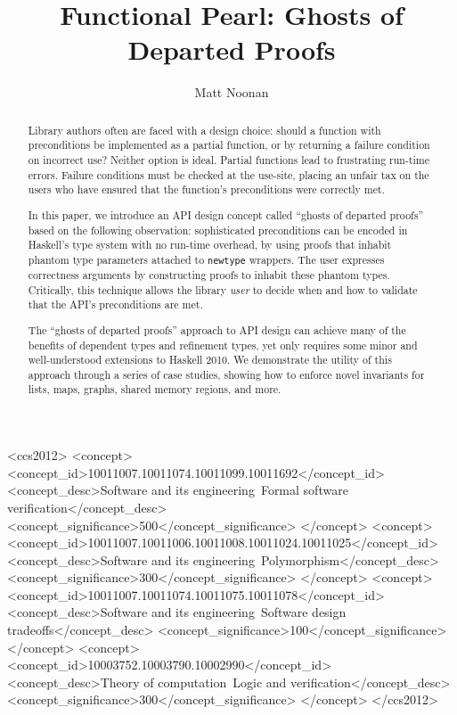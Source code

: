 \documentclass[format=sigplan, review=false, screen=true]{acmart}
\begin{document}
\title[Ghosts of Departed Proofs]{Functional Pearl: Ghosts of Departed Proofs}

\author{Matt Noonan}


\begin{abstract}

  Library authors often are faced with a design choice: should a function with
  preconditions be implemented as a partial function, or by returning a failure
  condition on incorrect use? Neither option is ideal. Partial functions lead
  to frustrating run-time errors. Failure conditions must be checked
  at the use-site,
  placing an unfair tax on the users who have ensured that the function's
  preconditions were correctly met.
  
  In this paper, we introduce an API design concept called ``ghosts of departed
  proofs'' based on the following observation: sophisticated preconditions can be
  encoded in Haskell's type system with no run-time overhead, by using proofs
  that inhabit phantom type parameters attached to \texttt{newtype} wrappers.
  The user expresses correctness arguments by constructing proofs to inhabit
  these phantom types.
  Critically, this technique allows the
  library \emph{user} to decide when and how to validate that the API's preconditions
  are met.

  The ``ghosts of departed proofs'' approach to API design can achieve many of the benefits
  of dependent types and refinement types, yet only requires some minor and well-understood
  extensions to Haskell 2010. We demonstrate the utility of this approach
  through a series of case studies, showing how to enforce novel invariants for lists,
  maps, graphs, shared memory regions, and more.
\end{abstract}


%
%
 \begin{CCSXML}
<ccs2012>
<concept>
<concept_id>10011007.10011074.10011099.10011692</concept_id>
<concept_desc>Software and its engineering~Formal software verification</concept_desc>
<concept_significance>500</concept_significance>
</concept>
<concept>
<concept_id>10011007.10011006.10011008.10011024.10011025</concept_id>
<concept_desc>Software and its engineering~Polymorphism</concept_desc>
<concept_significance>300</concept_significance>
</concept>
<concept>
<concept_id>10011007.10011074.10011075.10011078</concept_id>
<concept_desc>Software and its engineering~Software design tradeoffs</concept_desc>
<concept_significance>100</concept_significance>
</concept>
<concept>
<concept_id>10003752.10003790.10002990</concept_id>
<concept_desc>Theory of computation~Logic and verification</concept_desc>
<concept_significance>300</concept_significance>
</concept>
</ccs2012>
\end{CCSXML}
\end{document}
